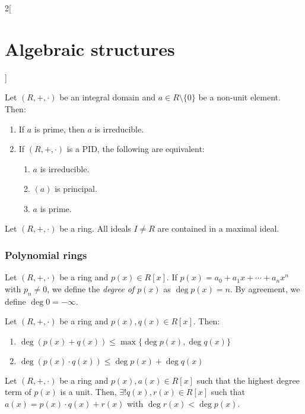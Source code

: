 \documentclass[../../../main.tex]{subfiles}
\begin{document}
\begin{multicols}{2}[\section{Algebraic structures}]
\begin{definition}
\end{definition}
\begin{prop}
    Let $(R,+,\cdot)$ be an integral domain and $a\in R\setminus\{0\}$ be a non-unit element. Then:
    \begin{enumerate}
        \item If $a$ is prime, then $a$ is irreducible.
        \item If $(R,+,\cdot)$ is a PID, the following are equivalent:
        \begin{enumerate}
            \item $a$ is irreducible.
            \item $(a)$ is principal.
            \item $a$ is prime.
        \end{enumerate}
    \end{enumerate}
\end{prop}
\begin{theorem}
    Let $(R,+,\cdot)$ be a ring. All ideals $I\ne R$ are contained in a maximal ideal.
\end{theorem}
\subsubsection*{Polynomial rings}
\begin{definition}
    Let $(R,+,\cdot)$ be a ring and $p(x)\in R[x]$. If $p(x)=a_0+a_1x+\cdots+a_nx^n$ with $p_n\ne 0$, we define the \textit{degree of $p(x)$} as $\deg p(x)=n$. By agreement, we define $\deg 0=-\infty$.
\end{definition}
\begin{prop}
    Let $(R,+,\cdot)$ be a ring and $p(x),q(x)\in R[x]$. Then:
    \begin{enumerate}
        \item $\deg(p(x)+q(x))\leq\max\{\deg p(x),\deg q(x)\}$
        \item $\deg(p(x)\cdot q(x))\leq\deg p(x)+\deg q(x)$
    \end{enumerate}
\end{prop}
\begin{prop}
    Let $(R,+,\cdot)$ be a ring and $p(x),a(x)\in R[x]$ such that the highest degree term of $p(x)$ is a unit. Then, $\exists!q(x),r(x)\in R[x]$ such that $a(x)=p(x)\cdot q(x)+r(x)$ with $\deg r(x)<\deg p(x)$.
\end{prop}

\end{multicols}
\end{document}
